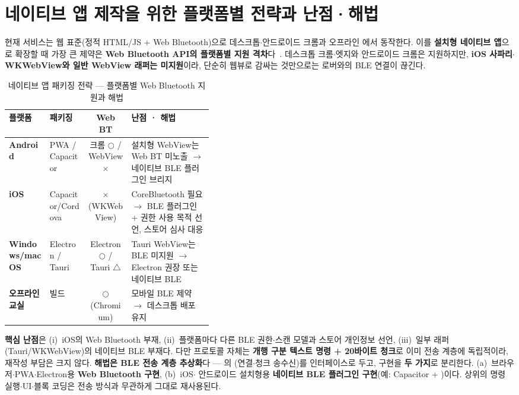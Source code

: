 \section{네이티브 앱 제작을 위한 플랫폼별 전략과 난점·해법}
현재 서비스는 웹 표준(정적 HTML/JS + Web Bluetooth)으로 데스크톱$\cdot$안드로이드 크롬과
오프라인 에서 동작한다. 이를 \textbf{설치형 네이티브 앱}으로 확장할 때 가장 큰
제약은 \textbf{Web Bluetooth API의 플랫폼별 지원 격차}다~\cite{webbluetooth,bluetooth54}. 데스크톱
크롬$\cdot$엣지와 안드로이드 크롬은 지원하지만, \textbf{iOS 사파리$\cdot$WKWebView와 일반
WebView 래퍼는 미지원}이라, 단순히 웹뷰로 감싸는 것만으로는 로버와의 BLE 연결이 끊긴다.

\begin{table}[htbp]\centering\small
\caption{네이티브 앱 패키징 전략 --- 플랫폼별 Web Bluetooth 지원과 해법}
\renewcommand{\arraystretch}{1.25}
\begin{tabularx}{\linewidth}{@{}>{\sffamily\bfseries}l >{\footnotesize}l c L{0.40\linewidth}@{}}
\toprule
\sffamily 플랫폼 & \sffamily 패키징 & \sffamily Web BT & \sffamily 난점 · 해법 \\
\midrule
Android & PWA / Capacitor & 크롬 $\bigcirc$ / WebView $\times$ & 설치형 WebView는 Web BT 미노출 $\to$ 네이티브 BLE 플러그인 브리지 \\
iOS & Capacitor/Cordova & $\times$ (WKWebView) & CoreBluetooth 필요 $\to$ BLE 플러그인 + 권한 사용 목적 선언, 스토어 심사 대응 \\
Windows/macOS & Electron / Tauri & Electron $\bigcirc$ / Tauri $\triangle$ & Tauri WebView는 BLE 미지원 $\to$ Electron 권장 또는 네이티브 BLE \\
오프라인 교실 &  빌드 & $\bigcirc$ (Chromium) & 모바일  BLE 제약 $\to$ 데스크톱  배포 유지 \\
\bottomrule
\end{tabularx}
\end{table}

\textbf{핵심 난점}은 (i)~iOS의 Web Bluetooth 부재, (ii)~플랫폼마다 다른 BLE 권한$\cdot$스캔
모델과 스토어 개인정보 선언, (iii)~일부 래퍼(Tauri/WKWebView)의 네이티브 BLE 부재다. 다만
프로토콜 자체는 \textbf{개행 구분 텍스트 명령 + 20바이트 청크}로 이미 전송 계층에 독립적이라,
재작성 부담은 크지 않다. \textbf{해법은 BLE 전송 계층 추상화}다 --- 의
(연결$\cdot$청크 송수신)를 인터페이스로 두고, 구현을 \textbf{두 가지}로
분리한다. (a)~브라우저$\cdot$PWA$\cdot$Electron용 \textbf{Web Bluetooth 구현}, (b)~iOS$\cdot$%
안드로이드 설치형용 \textbf{네이티브 BLE 플러그인 구현}(예: Capacitor + )이다. 상위의 명령 실행$\cdot$UI$\cdot$블록 코딩은 전송 방식과 무관하게 그대로
재사용된다.

